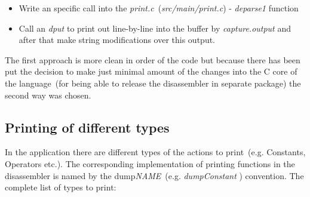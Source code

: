 \documentclass[thesis=M,english]{FITthesis}[2018/10/20]
\begin{document}
\begin{itemize}
	\item Write an specific call into the \textit{print.c}~(\textit{src/main/print.c}) - \textit{deparse1} function
	\item Call an \textit{dput} to print out line-by-line into the buffer by \textit{capture.output} and after that make string modifications over this output.
\end{itemize}

The first approach is more clean in order of the code but because there has been put the decision to make just minimal amount of the changes into the C core of the language~(for being able to release the disassembler in separate package) the second way was chosen.


\subsection{Printing of different types}

In the application there are different types of the actions to print~(e.g. Constants, Operators etc.). The corresponding implementation of printing functions in the disassembler is named by the dump\textit{NAME}~(e.g. \textit{dumpConstant} ) convention. The complete list of types to print:
\end{document}
